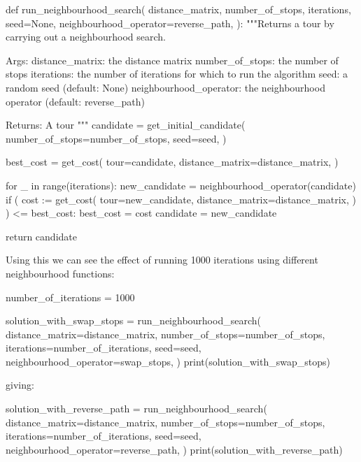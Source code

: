 \begin{pyin}
def run_neighbourhood_search(
    distance_matrix,
    number_of_stops,
    iterations,
    seed=None,
    neighbourhood_operator=reverse_path,
):
    """Returns a tour by carrying out a neighbourhood search.

    Args:
        distance_matrix: the distance matrix
        number_of_stops: the number of stops
        iterations: the number of iterations for which to
                    run the algorithm
        seed: a random seed (default: None)
        neighbourhood_operator: the neighbourhood operator
                                (default: reverse_path)

    Returns:
        A tour
    """
    candidate = get_initial_candidate(
        number_of_stops=number_of_stops,
        seed=seed,
    )

    best_cost = get_cost(
        tour=candidate,
        distance_matrix=distance_matrix,
    )

    for _ in range(iterations):
        new_candidate = neighbourhood_operator(candidate)
        if (
            cost := get_cost(
                tour=new_candidate,
                distance_matrix=distance_matrix,
            )
        ) <= best_cost:
            best_cost = cost
            candidate = new_candidate

    return candidate
\end{pyin}

Using this we can see the effect of running 1000 iterations using different
neighbourhood functions:


\begin{pyin}
number_of_iterations = 1000

solution_with_swap_stops = run_neighbourhood_search(
    distance_matrix=distance_matrix,
    number_of_stops=number_of_stops,
    iterations=number_of_iterations,
    seed=seed,
    neighbourhood_operator=swap_stops,
)
print(solution_with_swap_stops)
\end{pyin}

giving:

\begin{pyout}
[0, 7, 2, 8, 5, 3, 1, 9, 12, 11, 4, 10, 6, 0]
\end{pyout}

\begin{pyin}
solution_with_reverse_path = run_neighbourhood_search(
    distance_matrix=distance_matrix,
    number_of_stops=number_of_stops,
    iterations=number_of_iterations,
    seed=seed,
    neighbourhood_operator=reverse_path,
)
print(solution_with_reverse_path)
\end{pyin}

